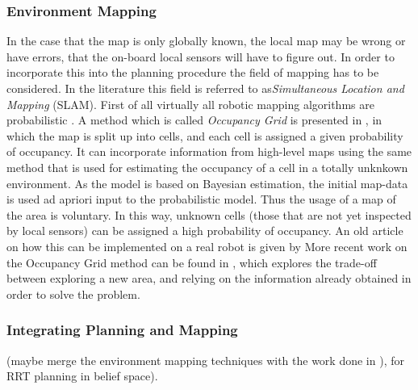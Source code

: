 \subsubsection{Environment Mapping}
In the case that the map is only globally known, the local map may be wrong or
have errors, that the on-board local sensors will have to figure out. In order
to incorporate this into the planning procedure the field of mapping has to be
considered. In the literature this field is referred to as\textit{Simultaneous
  Location and Mapping} (SLAM). First of all virtually all robotic mapping
algorithms are probabilistic \cite{thrunRoboticMappingSurvey}. %
A method which is called \textit{Occupancy Grid} is presented in
\cite{elfes1989using}, in which the map is split up into cells, and each cell is
assigned a given probability of occupancy. It can incorporate information from
high-level maps using the same method that is used for estimating the occupancy
of a cell in a totally unknkown environment. As the model is based on Bayesian
estimation, the initial map-data is used ad apriori input to the probabilistic
model. Thus the usage of a map of the area is voluntary. In this way, unknown
cells (those that are not yet inspected by local sensors) can be assigned a high
probability of occupancy. An old article on how this can be implemented on a
real robot is given by \cite[Krugman]{kriegman1987mobile} More recent work on
the Occupancy Grid method can be found in
\cite{carrilloAutonomousRoboticExploration2015}, which explores the trade-off
between exploring a new area, and relying on the information already obtained in
order to solve the problem. 
\subsubsection{Integrating Planning and Mapping}
(maybe merge the environment mapping techniques with the work done in
\cite[Bry]{bryRapidlyexploringRandomBelief2011}), for RRT planning in belief
space). 

